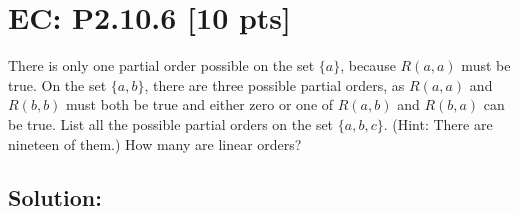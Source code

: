 \documentclass[12pt]{article}
\begin{document}
\newpage
\section*{\textbf{EC: P2.10.6} [10 pts]}
There is only one partial order possible on the set $\{a\}$, because $R(a, a)$ must be true. On the set $\{a, b\}$, there are three possible partial orders, as $R(a, a)$ and $R(b, b)$ must both be true and either zero or one of $R(a, b)$ and $R(b, a)$ can be true. List all the possible partial orders on the set $\{a, b, c\}$. (Hint: There are nineteen of them.) How many are linear orders?


\subsection*{\textbf{Solution:}}
\end{document}
